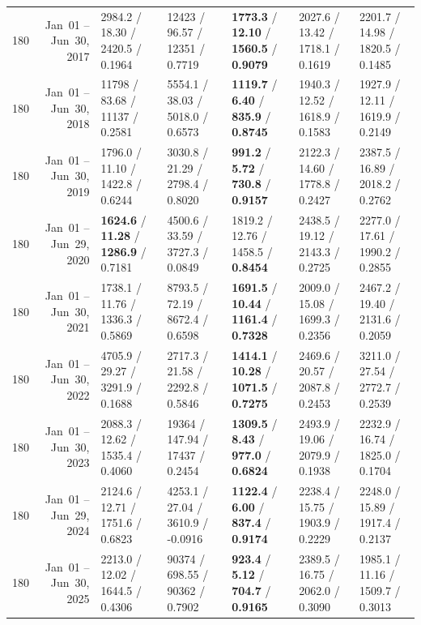 \begin{longtable}{r r l l l l l}
180 & Jan~01 -- Jun~30, 2017 & 2984.2 / 18.30 / 2420.5 / 0.1964 & 12423 / 96.57 / 12351 / 0.7719 & \textbf{1773.3} / \textbf{12.10} / \textbf{1560.5} / \textbf{0.9079} & 2027.6 / 13.42 / 1718.1 / 0.1619 & 2201.7 / 14.98 / 1820.5 / 0.1485 \\
180 & Jan~01 -- Jun~30, 2018 & 11798 / 83.68 / 11137 / 0.2581 & 5554.1 / 38.03 / 5018.0 / 0.6573 & \textbf{1119.7} / \textbf{6.40} / \textbf{835.9} / \textbf{0.8745} & 1940.3 / 12.52 / 1618.9 / 0.1583 & 1927.9 / 12.11 / 1619.9 / 0.2149 \\
180 & Jan~01 -- Jun~30, 2019 & 1796.0 / 11.10 / 1422.8 / 0.6244 & 3030.8 / 21.29 / 2798.4 / 0.8020 & \textbf{991.2} / \textbf{5.72} / \textbf{730.8} / \textbf{0.9157} & 2122.3 / 14.60 / 1778.8 / 0.2427 & 2387.5 / 16.89 / 2018.2 / 0.2762 \\
180 & Jan~01 -- Jun~29, 2020 & \textbf{1624.6} / \textbf{11.28} / \textbf{1286.9} / 0.7181 & 4500.6 / 33.59 / 3727.3 / 0.0849 & 1819.2 / 12.76 / 1458.5 / \textbf{0.8454} & 2438.5 / 19.12 / 2143.3 / 0.2725 & 2277.0 / 17.61 / 1990.2 / 0.2855 \\
180 & Jan~01 -- Jun~30, 2021 & 1738.1 / 11.76 / 1336.3 / 0.5869 & 8793.5 / 72.19 / 8672.4 / 0.6598 & \textbf{1691.5} / \textbf{10.44} / \textbf{1161.4} / \textbf{0.7328} & 2009.0 / 15.08 / 1699.3 / 0.2356 & 2467.2 / 19.40 / 2131.6 / 0.2059 \\
180 & Jan~01 -- Jun~30, 2022 & 4705.9 / 29.27 / 3291.9 / 0.1688 & 2717.3 / 21.58 / 2292.8 / 0.5846 & \textbf{1414.1} / \textbf{10.28} / \textbf{1071.5} / \textbf{0.7275} & 2469.6 / 20.57 / 2087.8 / 0.2453 & 3211.0 / 27.54 / 2772.7 / 0.2539 \\
180 & Jan~01 -- Jun~30, 2023 & 2088.3 / 12.62 / 1535.4 / 0.4060 & 19364 / 147.94 / 17437 / 0.2454 & \textbf{1309.5} / \textbf{8.43} / \textbf{977.0} / \textbf{0.6824} & 2493.9 / 19.06 / 2079.9 / 0.1938 & 2232.9 / 16.74 / 1825.0 / 0.1704 \\
180 & Jan~01 -- Jun~29, 2024 & 2124.6 / 12.71 / 1751.6 / 0.6823 & 4253.1 / 27.04 / 3610.9 / -0.0916 & \textbf{1122.4} / \textbf{6.00} / \textbf{837.4} / \textbf{0.9174} & 2238.4 / 15.75 / 1903.9 / 0.2229 & 2248.0 / 15.89 / 1917.4 / 0.2137 \\
180 & Jan~01 -- Jun~30, 2025 & 2213.0 / 12.02 / 1644.5 / 0.4306 & 90374 / 698.55 / 90362 / 0.7902 & \textbf{923.4} / \textbf{5.12} / \textbf{704.7} / \textbf{0.9165} & 2389.5 / 16.75 / 2062.0 / 0.3090 & 1985.1 / 11.16 / 1509.7 / 0.3013 \\
\end{longtable}

